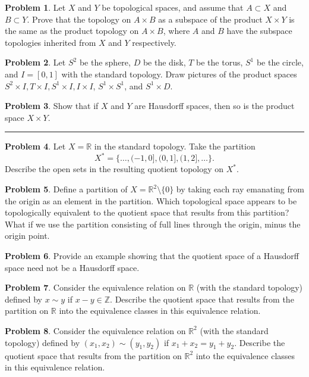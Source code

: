 \documentclass{amsart}
\newcommand{\+}[1]{\ensuremath{\mathbf{#1}}}
\newcommand{\Z}{{\mathbb Z}}
\newcommand{\R}{{\mathbb R}}
\theoremstyle{definition}
\newtheorem{prob}{Problem}
\begin{document}
\begin{prob}
 Let $X$ and $Y$ be topological spaces, and assume that $A \subset X$ and $B \subset Y$.
 Prove that the topology on $A \times B$ as a subspace of the product $X \times Y$
 is the same as the product topology on $A \times B$, where $A$ and $B$ have the subspace topologies
 inherited from $X$ and $Y$ respectively.
\end{prob}

\begin{prob}
 Let $S^2$ be the sphere, $D$ be the disk, $T$ be the torus, $S^1$ be the circle, and $I = [0,1]$ with the standard topology.
 Draw pictures of the product spaces
 $S^2 \times I, T \times I, S^1 \times I, I \times I$, $S^1 \times S^1$, and $S^1 \times D$.
\end{prob}

\begin{prob}
 Show that if $X$ and $Y$ are Hausdorff spaces, then so is the product space $X \times Y$.
\end{prob}

\rule{14cm}{0.4pt}
\vspace{.5cm}

\begin{prob}
 Let $X = \R$ in the standard topology.  Take the partition 
 \[
 X^* = \{\ldots, (-1,0],(0,1],(1,2],\ldots\}.
 \] 
 Describe the open sets in the resulting quotient topology on $X^*$.
\end{prob}


\begin{prob}
 Define a partition of $X = \R^2 \setminus \{0\}$ by taking each ray emanating from the origin as an element
 in the partition.  Which topological space appears to be topologically equivalent to the
 quotient space that results from this partition?
 What if we use the partition consisting of full lines through the origin, minus the origin point.
\end{prob}

\begin{prob}
 Provide an example showing that the quotient space of a Hausdorff space need not be a Hausdorff space.
\end{prob}

\begin{prob}
 Consider the equivalence relation on $\R$ (with the standard topology) defined by $x \sim y$ if $x-y \in \Z$.
 Describe the quotient space that results from the partition on $\R$ into the equivalence classes
 in this equivalence relation.
\end{prob}

\begin{prob}
 Consider the equivalence relation on $\R^2$ (with the standard topology) defined by $(x_1,x_2) \sim (y_1,y_2)$ if
 $x_1 + x_2 = y_1 + y_2$.
 Describe the quotient space that results from the partition on $\R^2$ into the equivalence classes
 in this equivalence relation.
\end{prob}
\end{document}

